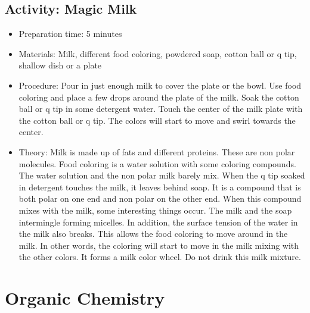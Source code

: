 \begin{itemize}
{\begin{itemize}
\begin{itemize}
{\subsection{Activity: Magic Milk}
\begin{itemize}
\item{Preparation time: 5 minutes}
\item{Materials: Milk, different food coloring, powdered soap, cotton ball or q tip, shallow dish or a plate}
\item{Procedure: Pour in just enough milk to cover the plate or the bowl. Use food coloring and place a few drops around the plate of the milk. Soak the cotton ball or q tip in some detergent water. Touch the center of the milk plate with the cotton ball or q tip. The colors will start to move and swirl towards the center.}
\item{Theory: Milk is made up of fats and different proteins. These are non polar molecules. Food coloring is a water solution with some coloring compounds. The water solution and the non polar milk barely mix. When the q tip soaked in detergent touches the milk, it leaves behind soap. It is a compound that is both polar on one end and non polar on the other end. When this compound mixes with the milk, some interesting things occur. The milk and the soap intermingle forming micelles. In addition, the surface tension of the water in the milk also breaks. This allows the food coloring to move around in the milk. In other words, the coloring will start to move in the milk mixing with the other colors. It forms a milk color wheel. Do not drink this milk mixture.}
\end{itemize}

\section{Organic Chemistry}

}
\end{itemize}
\end{itemize}}
\end{itemize}
